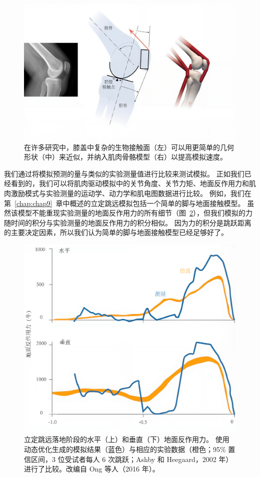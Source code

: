 \begin{figure}[!htb]
	\centering
	\includegraphics[width=1.0\linewidth]{chap10/10_9}
	\caption{在许多研究中，膝盖中复杂的生物接触面（左）可以用更简单的几何形状（中）来近似，并纳入肌肉骨骼模型（右）以提高模拟速度。 \label{fig:10_9}}
\end{figure}


我们通过将模拟预测的量与类似的实验测量值进行比较来测试模拟。
正如我们已经看到的，我们可以将肌肉驱动模拟中的关节角度、关节力矩​​、地面反作用力和肌肉激励模式与实验测量的运动学、动力学和肌电图数据进行比较。
例如，我们在第~\ref{chap:chap9}~章中概述的立定跳远模拟包括一个简单的脚与地面接触模型。
虽然该模型不能重现实验测量的地面反作用力的所有细节（图~\ref{fig:10_10}），但我们模拟的力随时间的积分与实验测量的地面反作用力的积分相似。
因为力的积分是跳跃距离的主要决定因素，所以我们认为简单的脚与地面接触模型已经足够好了。


\begin{figure}[!htb]
	\centering
	\includegraphics[width=1.0\linewidth]{chap10/10_10}
	\caption{立定跳远落地阶段的水平（上）和垂直（下）地面反作用力。
		使用动态优化生成的模拟结果（蓝色）与相应的实验数据（橙色；95\% 置信区间，3 位受试者每人 6 次跳跃；Ashby 和 Heegaard，2002 年）进行了比较。改编自 Ong 等人（2016 年）。 \label{fig:10_10}}
\end{figure}


